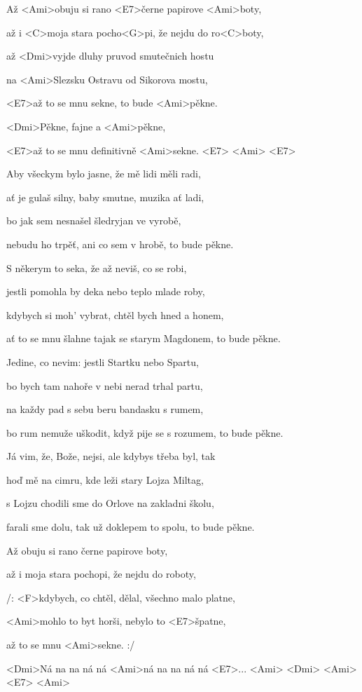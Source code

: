 


\zs
Až <Ami>obuju si rano <E7>černe papirove <Ami>boty,

až i <C>moja stara pocho<G>pi, že nejdu do ro<C>boty,

až <Dmi>vyjde dluhy pruvod smutečnich hostu

na <Ami>Slezsku Ostravu od Sikorova mostu,

<E7>až to se mnu sekne, to bude <Ami>pěkne.
\ks

\zr
<Dmi>Pěkne, fajne a <Ami>pěkne,

<E7>až to se mnu definitivně <Ami>sekne. <E7> <Ami> <E7>
\kr

\zs
Aby všeckym bylo jasne, že mě lidi měli radi,

ať je gulaš silny, baby smutne, muzika ať ladi,

bo jak sem nesnašel šledryjan ve vyrobě,

nebudu ho trpěť, ani co sem v hrobě, to bude pěkne.
\ks

\zr\kr

\zs
S někerym to seka, že až neviš, co se robi,

jestli pomohla by deka nebo teplo mlade roby,

kdybych si moh' vybrat, chtěl bych hned a honem,

ať to se mnu šlahne tajak se starym Magdonem, to bude pěkne.
\ks

\zr\kr

\zs
Jedine, co nevim: jestli Startku nebo Spartu,

bo bych tam nahoře v nebi nerad trhal partu,

na každy pad s sebu beru bandasku s rumem,

bo rum nemuže uškodit, když pije se s rozumem, to bude pěkne.
\ks

\zr\kr

\zs
Já vim, že, Bože, nejsi, ale kdybys třeba byl, tak

hoď mě na cimru, kde leži stary Lojza Miltag,

s Lojzu chodili sme do Orlove na zakladni školu,

farali sme dolu, tak už doklepem to spolu, to bude pěkne.
\ks

\zr\kr

\zs
Až obuju si rano černe papirove boty,

až i moja stara pochopi, že nejdu do roboty,

/: <F>kdybych, co chtěl, dělal, všechno malo platne,

<Ami>mohlo to byt horši, nebylo to <E7>špatne,

až to se mnu <Ami>sekne. :/
\ks

<Dmi>Ná na na ná ná <Ami>ná na na ná ná <E7>...
<Ami> <Dmi> <Ami> <E7> <Ami>

\kp
